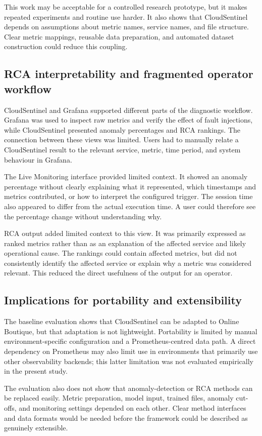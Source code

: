 This work may be acceptable for a controlled research prototype, but it makes repeated experiments and routine use harder. It also shows that CloudSentinel depends on assumptions about metric names, service names, and file structure. Clear metric mappings, reusable data preparation, and automated dataset construction could reduce this coupling.

\subsection{RCA interpretability and fragmented operator workflow}
CloudSentinel and Grafana supported different parts of the diagnostic workflow. Grafana was used to inspect raw metrics and verify the effect of fault injections, while CloudSentinel presented anomaly percentages and RCA rankings. The connection between these views was limited. Users had to manually relate a CloudSentinel result to the relevant service, metric, time period, and system behaviour in Grafana.

The Live Monitoring interface provided limited context. It showed an anomaly percentage without clearly explaining what it represented, which timestamps and metrics contributed, or how to interpret the configured trigger. The session time also appeared to differ from the actual execution time. A user could therefore see the percentage change without understanding why.

RCA output added limited context to this view. It was primarily expressed as ranked metrics rather than as an explanation of the affected service and likely operational cause. The rankings could contain affected metrics, but did not consistently identify the affected service or explain why a metric was considered relevant. This reduced the direct usefulness of the output for an operator.

\subsection{Implications for portability and extensibility}
The baseline evaluation shows that CloudSentinel can be adapted to Online Boutique, but that adaptation is not lightweight. Portability is limited by manual environment-specific configuration and a Prometheus-centred data path. A direct dependency on Prometheus may also limit use in environments that primarily use other observability backends; this latter limitation was not evaluated empirically in the present study.

The evaluation also does not show that anomaly-detection or RCA methods can be replaced easily. Metric preparation, model input, trained files, anomaly cut-offs, and monitoring settings depended on each other. Clear method interfaces and data formats would be needed before the framework could be described as genuinely extensible.

